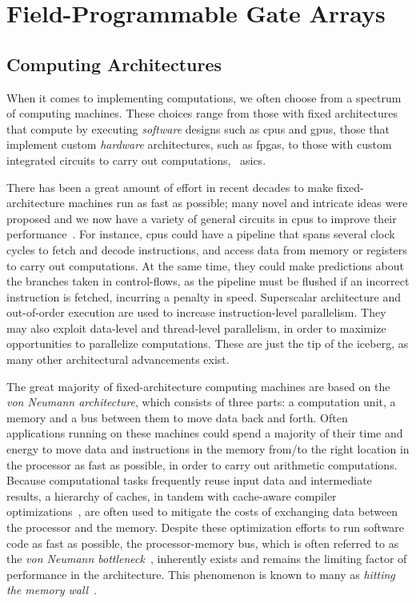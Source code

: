 \section{Field-Programmable Gate Arrays}
\label{bg:sec:fpga}

\subsection{Computing Architectures}
\label{bg:sub:computing_architectures}

When it comes to implementing computations, we often choose from a spectrum of
computing machines.  These choices range from those with fixed architectures
that compute by executing \emph{software} designs such as \glspl{cpu} and
\glspl{gpu}, those that implement custom \emph{hardware} architectures,
such as \glspl{fpga}, to those with custom integrated circuits to carry out
computations, \ie~\glspl{asic}.

There has been a great amount of effort in recent decades to make
fixed-architecture machines run as fast as possible; many novel and intricate
ideas were proposed and we now have a variety of general circuits in
\glspl{cpu} to improve their performance~\cite{comparch}.  For instance,
\glspl{cpu} could have a pipeline that spans several clock cycles to fetch and
decode instructions, and access data from memory or registers to carry out
computations.  At the same time, they could make predictions about the branches
taken in control-flows, as the pipeline must be flushed if an incorrect
instruction is fetched, incurring a penalty in speed.  Superscalar architecture
and out-of-order execution are used to increase instruction-level parallelism.
They may also exploit data-level and thread-level parallelism, in order to
maximize opportunities to parallelize computations.  These are just the tip of
the iceberg, as many other architectural advancements exist.

The great majority of fixed-architecture computing machines are based on the
\emph{von Neumann architecture}, which consists of three parts: a computation
unit, a memory and a bus between them to move data back and forth.  Often
applications running on these machines could spend a majority of their time
and energy to move data and instructions in the memory from/to the right
location in the processor as fast as possible, in order to carry out arithmetic
computations.  Because computational tasks frequently reuse input data and
intermediate results, a hierarchy of caches, in tandem with cache-aware
compiler optimizations~\cite{kowarschik03}, are often used to mitigate the
costs of exchanging data between the processor and the memory.  Despite
these optimization efforts to run software code as fast as possible, the
processor-memory bus, which is often referred to as the \emph{von Neumann
bottleneck}~\cite{backus78}, inherently exists and remains the limiting factor
of performance in the architecture.  This phenomenon is known to many as
\emph{hitting the memory wall}~\cite{bacon13, wulf94}.


